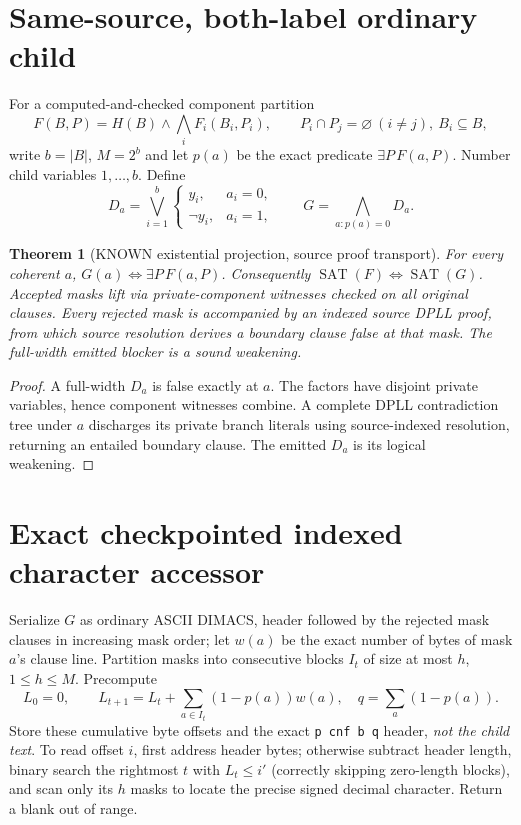 \documentclass[11pt]{article}
\newtheorem{theorem}{Theorem}
\begin{document}
\section{Same-source, both-label ordinary child}
For a computed-and-checked component partition
\[
 F(B,P)=H(B)\land\bigwedge_i F_i(B_i,P_i),
 \qquad P_i\cap P_j=\varnothing\ (i\ne j),\ B_i\subseteq B,
\]
write $b=|B|$, $M=2^b$ and let $p(a)$ be the exact predicate
$\exists P\,F(a,P)$. Number child variables $1,\ldots,b$. Define
\[
 D_a=\bigvee_{i=1}^b
 \begin{cases} y_i,&a_i=0,\\ \neg y_i,&a_i=1,\end{cases}
 \qquad G=\bigwedge_{a:p(a)=0}D_a.
\]
\begin{theorem}[KNOWN existential projection, source proof transport]
For every coherent $a$, $G(a)\Leftrightarrow\exists P\,F(a,P)$.
Consequently $\operatorname{SAT}(F)\Leftrightarrow\operatorname{SAT}(G)$.
Accepted masks lift via private-component witnesses checked on all
original clauses. Every rejected mask is accompanied by an indexed
source DPLL proof, from which source resolution derives a boundary clause
false at that mask. The full-width emitted blocker is a sound weakening.
\end{theorem}
\begin{proof} A full-width $D_a$ is false exactly at $a$.
The factors have disjoint private variables, hence component witnesses
combine. A complete DPLL contradiction tree under $a$ discharges its
private branch literals using source-indexed resolution, returning an
entailed boundary clause. The emitted $D_a$ is its logical weakening.
\end{proof}

\section{Exact checkpointed indexed character accessor}
Serialize $G$ as ordinary ASCII DIMACS, header followed by the rejected
mask clauses in increasing mask order; let $w(a)$ be the exact number of
bytes of mask $a$'s clause line. Partition masks into consecutive blocks
$I_t$ of size at most $h$, $1\le h\le M$. Precompute
\[
 L_0=0,\qquad
 L_{t+1}=L_t+\sum_{a\in I_t}(1-p(a))w(a),\quad
 q=\sum_a(1-p(a)).
\]
Store these cumulative byte offsets and the exact
\texttt{p cnf b q} header, \emph{not the child text}. To read offset $i$,
first address header bytes; otherwise subtract header length, binary
search the rightmost $t$ with $L_t\le i'$ (correctly skipping zero-length
blocks), and scan only its $h$ masks to locate the precise signed
decimal character. Return a blank out of range.
\end{document}
